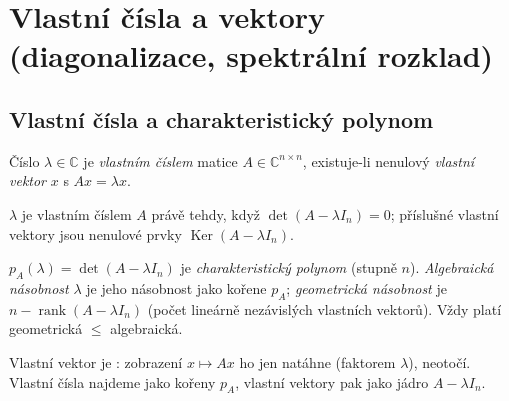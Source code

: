 \documentclass[11pt,a4paper]{article}
\newcommand{\rank}{\operatorname{rank}}
\newcommand{\Ker}{\operatorname{Ker}}
\begin{document}
\section{Vlastní čísla a vektory (diagonalizace, spektrální rozklad)}

\subsection{Vlastní čísla a charakteristický polynom}

\begin{definice}
Číslo $\lambda\in\mathbb{C}$ je \emph{vlastním číslem} matice $A\in\mathbb{C}^{n\times n}$, existuje-li nenulový \emph{vlastní vektor} $x$ s $Ax=\lambda x$.
\end{definice}

\begin{veta}[Charakterizace]
$\lambda$ je vlastním číslem $A$ právě tehdy, když $\det(A-\lambda I_n)=0$; příslušné vlastní vektory jsou nenulové prvky $\Ker(A-\lambda I_n)$.
\end{veta}

\begin{definice}
$p_A(\lambda)=\det(A-\lambda I_n)$ je \emph{charakteristický polynom} (stupně $n$). \emph{Algebraická násobnost} $\lambda$ je jeho násobnost jako kořene $p_A$; \emph{geometrická násobnost} je $n-\rank(A-\lambda I_n)$ (počet lineárně nezávislých vlastních vektorů). Vždy platí geometrická $\le$ algebraická.
\end{definice}

\begin{intuice}
Vlastní vektor je : zobrazení $x\mapsto Ax$ ho jen natáhne (faktorem $\lambda$), neotočí. Vlastní čísla najdeme jako kořeny $p_A$, vlastní vektory pak jako jádro $A-\lambda I_n$.
\end{intuice}

\begin{center}
\end{center}
\end{document}
